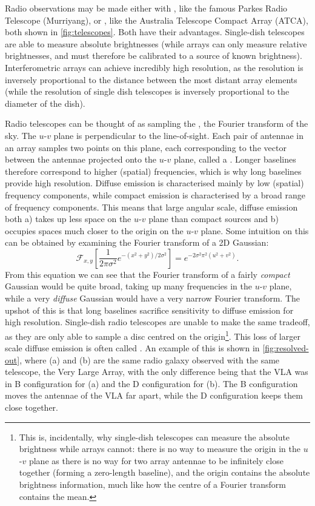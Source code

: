         Radio observations may be made either with , like the famous Parkes Radio Telescope (Murriyang), or , like the Australia Telescope Compact Array (ATCA), both shown in \autoref{fig:telescopes}. Both have their advantages. Single-dish telescopes are able to measure absolute brightnesses (while arrays can only measure relative brightnesses, and must therefore be calibrated to a source of known brightness). Interferometric arrays can achieve incredibly high resolution, as the resolution is inversely proportional to the distance between the most distant array elements (while the resolution of single dish telescopes is inversely proportional to the diameter of the dish).

        Radio telescopes can be thought of as sampling the , the Fourier transform of the sky. The $u$-$v$ plane is perpendicular to the line-of-sight. Each pair of antennae in an array samples two points on this plane, each corresponding to the vector between the antennae projected onto the $u$-$v$ plane, called a . Longer baselines therefore correspond to higher (spatial) frequencies, which is why long baselines provide high resolution. Diffuse emission is characterised mainly by low (spatial) frequency components, while compact emission is characterised by a broad range of frequency components. This means that large angular scale, diffuse emission both a) takes up less space on the $u$-$v$ plane than compact sources and b) occupies spaces much closer to the origin on the $u$-$v$ plane. Some intuition on this can be obtained by examining the Fourier transform of a 2D Gaussian:
        \begin{equation}
            \mathcal F_{x, y}\left[\frac{1}{2\pi\sigma^2} e^{-(x^2 + y^2) / 2\sigma^2}\right] = e^{-2\sigma^2 \pi^2(u^2 + v^2)}.
        \end{equation}
        From this equation we can see that the Fourier transform of a fairly \emph{compact} Gaussian would be quite broad, taking up many frequencies in the $u$-$v$ plane, while a very \emph{diffuse} Gaussian would have a very narrow Fourier transform. The upshot of this is that long baselines sacrifice sensitivity to diffuse emission for high resolution. Single-dish radio telescopes are unable to make the same tradeoff, as they are only able to sample a disc centred on the origin\footnote{This is, incidentally, why single-dish telescopes can measure the absolute brightness while arrays cannot: there is no way to measure the origin in the $u$-$v$ plane as there is no way for two array antennae to be infinitely close together (forming a zero-length baseline), and the origin contains the absolute brightness information, much like how the centre of a Fourier transform contains the mean.}. This loss of larger scale diffuse emission is often called . An example of this is shown in \autoref{fig:resolved-out}, where (a) and (b) are the same radio galaxy observed with the same telescope, the Very Large Array, with the only difference being that the VLA was in B configuration for (a) and the D configuration for (b). The B configuration moves the antennae of the VLA far apart, while the D configuration keeps them close together.

